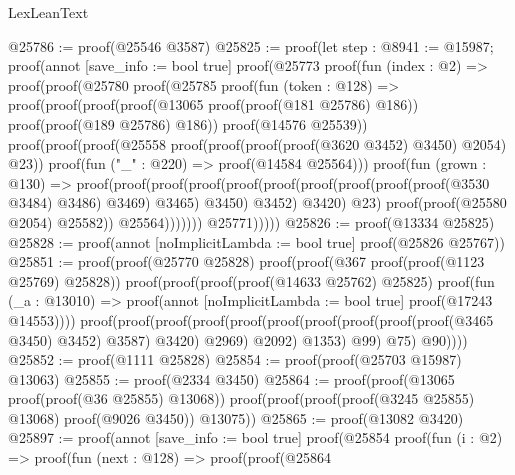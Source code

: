 \begin{lexlean}{LexLeanText}
\begin{coremodule}
@25786 := proof(@25546 @3587)
@25825 := proof(let step : @8941 := @15987;
    proof(annot [save_info := bool true]
      proof(@25773
          proof(fun (index : @2) =>
            proof(proof(@25780
                  proof(@25785
                      proof(fun (token : @128) =>
                        proof(proof(proof(proof(@13065 proof(proof(@181 @25786) @186))
                                proof(proof(@189 @25786) @186))
                              proof(@14576 @25539))
                            proof(proof(proof(@25558
                                    proof(proof(proof(proof(@3620 @3452) @3450) @2054) @23))
                                  proof(fun ("_" : @220) => proof(@14584 @25564)))
                                proof(fun (grown : @130) =>
                                  proof(proof(proof(proof(proof(proof(proof(proof(proof(proof(@3530
                                                        @3484)
                                                      @3486)
                                                    @3469)
                                                  @3465)
                                                @3450)
                                              @3452)
                                            @3420)
                                          @23)
                                        proof(proof(@25580 @2054) @25582))
                                      @25564)))))))
                @25771)))))
@25826 := proof(@13334 @25825)
@25828 := proof(annot [noImplicitLambda := bool true] proof(@25826 @25767))
@25851 := proof(proof(@25770 @25828)
      proof(proof(@367 proof(proof(@1123 @25769) @25828))
          proof(proof(proof(proof(@14633 @25762) @25825)
                proof(fun (_a : @13010) =>
                  proof(annot [noImplicitLambda := bool true] proof(@17243 @14553))))
              proof(proof(proof(proof(proof(proof(proof(proof(proof(proof(@3465 @3450) @3452) @3587)
                              @3420)
                            @2969)
                          @2092)
                        @1353)
                      @99)
                    @75)
                  @90))))
@25852 := proof(@1111 @25828)
@25854 := proof(proof(@25703 @15987) @13063)
@25855 := proof(@2334 @3450)
@25864 := proof(proof(@13065 proof(proof(@36 @25855) @13068))
      proof(proof(proof(proof(@3245 @25855) @13068) proof(@9026 @3450)) @13075))
@25865 := proof(@13082 @3420)
@25897 := proof(annot [save_info := bool true]
    proof(@25854
        proof(fun (i : @2) =>
          proof(fun (next : @128) =>
            proof(proof(@25864

\end{coremodule}
\end{lexlean}
